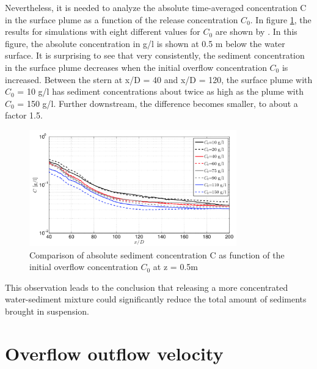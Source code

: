 \noindent Nevertheless, it is needed to analyze the absolute time-averaged concentration C in the surface plume as a function of the release concentration $C_0$. In figure \ref{fig:Sediment_load_2}, the results for simulations with eight different values for $C_0$ are shown by \cite{Decrop}. In this figure, the absolute concentration in g/l is shown at 0.5 m below the water surface. It is surprising to see that very consistently, the sediment concentration in the surface plume decreases when the initial overflow concentration $C_0$ is increased. Between the stern at x/D = 40 and x/D = 120, the surface plume with $C_0$ = 10 g/l has sediment concentrations about twice as high as the plume with $C_0$ = 150 g/l. Further downstream, the difference becomes smaller, to about a factor 1.5. \newline

\begin{figure}[ht!]
    \centering
    \includegraphics[width = 0.8\textwidth]{Images/Sediment_load_2.png}
    \caption{Comparison of absolute sediment concentration C as function of the initial overflow concentration $C_0$ at z = 0.5m}
    \label{fig:Sediment_load_2}
\end{figure}


\noindent This observation leads to the conclusion that releasing a more concentrated water-sediment mixture could significantly reduce the total amount of sediments brought in suspension.








\section{Overflow outflow velocity}

